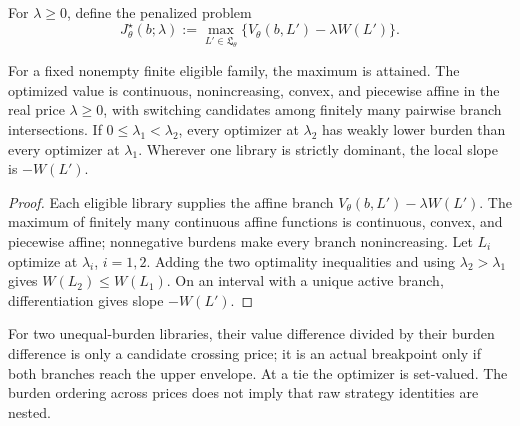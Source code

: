 For \(\lambda\geq0\), define the penalized problem
\[
 J_\theta^\star(b;\lambda)
 :=\max_{L'\in\mathfrak L_\theta}
 \{V_\theta(b,L')-\lambda W(L')\}.
\]

\begin{theorem}
\label{thm:or-penalized-envelope}
For a fixed nonempty finite eligible family, the maximum is attained. The
optimized value is continuous, nonincreasing, convex, and piecewise affine in
the real price \(\lambda\geq0\), with switching candidates among finitely many
pairwise branch intersections. If \(0\leq\lambda_1<\lambda_2\), every optimizer
at \(\lambda_2\) has weakly lower burden than every optimizer at
\(\lambda_1\). Wherever one library is strictly dominant, the local slope is
\(-W(L')\).
\end{theorem}

\begin{proof}
Each eligible library supplies the affine branch
\(V_\theta(b,L')-\lambda W(L')\). The maximum of finitely many continuous
affine functions is continuous, convex, and piecewise affine; nonnegative
burdens make every branch nonincreasing. Let \(L_i\) optimize at
\(\lambda_i\), \(i=1,2\). Adding the two optimality inequalities and using
\(\lambda_2>\lambda_1\) gives \(W(L_2)\leq W(L_1)\). On an interval with a
unique active branch, differentiation gives slope \(-W(L')\).
\end{proof}

For two unequal-burden libraries, their value difference divided by their
burden difference is only a candidate crossing price; it is an actual
breakpoint only if both branches reach the upper envelope. At a tie the
optimizer is set-valued. The burden ordering across prices does not imply that
raw strategy identities are nested.
